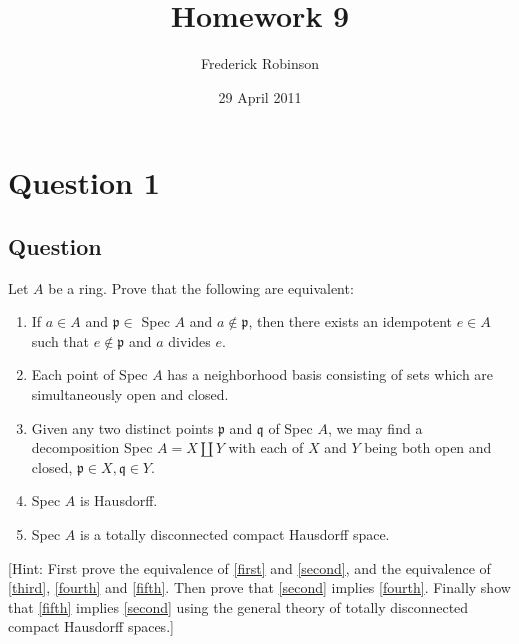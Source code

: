 \documentclass[11pt]{article}
\begin{document}



\title{Homework 9}
\author{Frederick Robinson}
\date{29 April 2011}
\maketitle




\section{Question 1}
\subsection{Question}
Let $A$ be a ring. Prove that the following are equivalent:
\begin{enumerate}
\item \label{first} If $a \in A$ and $\mathfrak{p} \in $ Spec $A$ and $a \notin \mathfrak{p}$, then there exists an idempotent $e \in A$ such that $e \notin \mathfrak{p}$ and $a$ divides $e$.
\item \label{second} Each point of Spec $A$ has a neighborhood basis consisting of sets which are simultaneously open and closed.
\item \label{third} Given any two distinct points $\mathfrak{p}$ and $\mathfrak{q}$ of Spec $A$, we may find a decomposition Spec $A = X \coprod Y$ with each of $X$ and $Y$ being both open and closed, $\mathfrak p \in X, \mathfrak q \in Y$.
\item \label{fourth} Spec $A$ is Hausdorff.
\item  \label{fifth} Spec $A$ is a totally disconnected compact Hausdorff space.
\end{enumerate}
[Hint: First prove the equivalence of \ref{first} and \ref{second}, and the equivalence of \ref{third}, \ref{fourth} and \ref{fifth}. Then prove that \ref{second} implies \ref{fourth}. Finally show that \ref{fifth} implies \ref{second} using the general theory of totally disconnected compact Hausdorff spaces.]
\end{document}
